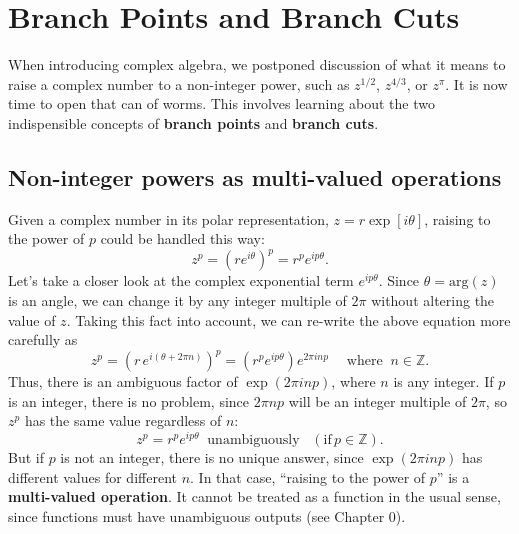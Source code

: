 \documentclass[10pt,a4paper]{article}
\begin{document}
\setcounter{page}{50}

\section{Branch Points and Branch Cuts}
\label{branch-points-and-branch-cuts}

When introducing complex algebra, we postponed discussion of what it
means to raise a complex number to a non-integer power, such as
$z^{1/2}$, $z^{4/3}$, or $z^{\pi}$. It is now time to open that
can of worms. This involves learning about the two indispensible
concepts of \textbf{branch points} and \textbf{branch cuts}.

\subsection{Non-integer powers as multi-valued operations}
\label{non-integer-powers-as-multi-valued-operations}

Given a complex number in its polar representation, $z =
r\exp[i\theta]$, raising to the power of $p$ could be handled this
way:
\begin{equation}
z^p = \left(re^{i\theta}\right)^p = r^p e^{ip\theta}.
\end{equation}
Let's take a closer look at the complex exponential term
$e^{ip\theta}$. Since $\theta = \mathrm{arg}(z)$ is an angle, we can
change it by any integer multiple of $2\pi$ without altering the value
of $z$. Taking this fact into account, we can re-write the above
equation more carefully as
\begin{equation}
z^p = \left(r\,e^{i(\theta + 2\pi n)}\right)^p = \left(r^p e^{ip\theta} \right) e^{2\pi i n p} \quad\; \mathrm{where}\;\; n\in\mathbb{Z}.
\end{equation}
Thus, there is an ambiguous factor of $\exp(2\pi i n p)$, where $n$ is
any integer. If $p$ is an integer, there is no problem, since $2\pi n
p$ will be an integer multiple of $2\pi$, so $z^p$ has the same value
regardless of $n$:
\begin{equation}
z^p = r^p e^{ip\theta} \;\;\textrm{unambiguously} \;\;\;(\text{if}\,p\in\mathbb{Z}).
\end{equation}
But if $p$ is not an integer, there is no unique answer, since
$\exp\left(2 \pi i np\right)$ has different values for different
$n$. In that case, ``raising to the power of $p$'' is a
\textbf{multi-valued operation}.  It cannot be treated as a function
in the usual sense, since functions must have unambiguous outputs (see
Chapter 0).
\end{document}
